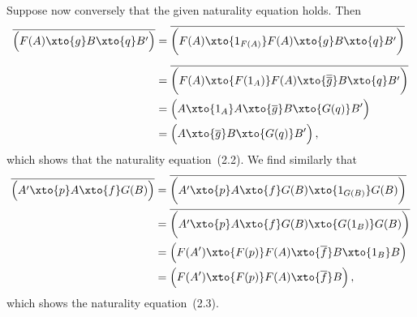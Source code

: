 Suppose now conversely that the given naturality equation holds.
Then
\begingroup
\allowdisplaybreaks
\begin{align*}
	\adjtranspose{
		\Bigl(
			F(A)
			\xto{g}
			B
			\xto{q}
			B'
		\Bigr)
	}
	&=
	\adjtranspose{
		\biggl(
			F(A)
			\xto{1_{F(A)}}
			F(A)
			\xto{g}
			B
			\xto{q}
			B'
		\biggr)
	}
	\\[0.5em]
	&=
	\adjtranspose{
		\biggl(
			F(A)
			\xto{F(1_A)}
			F(A)
			\xto{\adjtranspose{\adjtranspose{g}}}
			B
			\xto{q}
			B'
		\biggr)
	}
	\\
	&=
	\Bigl(
		A
		\xto{1_A}
		A
		\xto{\adjtranspose{g}}
		B
		\xto{G(q)}
		B'
	\Bigr)
	\\
	&=
	\Bigl(
		A
		\xto{\adjtranspose{g}}
		B
		\xto{G(q)}
		B'
	\Bigr) \,,
\end{align*}
\endgroup
which shows that the naturality equation~(2.2).
We find similarly that
\begingroup
\allowdisplaybreaks
\begin{align*}
	\adjtranspose{
		\Bigl(
			A'
			\xto{p}
			A
			\xto{f}
			G(B)
		\Bigr)
	}
	&=
	\adjtranspose{
		\biggl(
			A'
			\xto{p}
			A
			\xto{f}
			G(B)
			\xto{1_{G(B)}}
			G(B)
		\biggr)
	}
	\\
	&=
	\adjtranspose{
		\biggl(
			A'
			\xto{p}
			A
			\xto{f}
			G(B)
			\xto{G(1_B)}
			G(B)
		\biggr)
	}
	\\
	&=
	\Bigl(
		F(A')
		\xto{F(p)}
		F(A)
		\xto{\adjtranspose{f}}
		B
		\xto{1_B}
		B
	\Bigr)
	\\
	&=
	\Bigl(
		F(A')
		\xto{F(p)}
		F(A)
		\xto{\adjtranspose{f}}
		B
	\Bigr) \,,
\end{align*}
\endgroup
which shows the naturality equation~(2.3).
